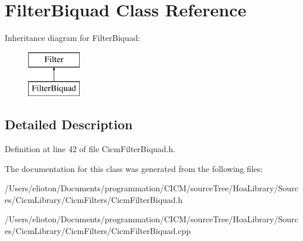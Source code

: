\hypertarget{class_filter_biquad}{\section{Filter\-Biquad Class Reference}
\label{class_filter_biquad}
}
Inheritance diagram for Filter\-Biquad\-:\begin{figure}[H]
\begin{center}
\leavevmode
\includegraphics[height=2.000000cm]{class_filter_biquad}
\end{center}
\end{figure}


\subsection{Detailed Description}


Definition at line 42 of file Cicm\-Filter\-Biquad.\-h.



The documentation for this class was generated from the following files\-:\begin{DoxyCompactItemize}
\item 
/\-Users/elioton/\-Documents/programmation/\-C\-I\-C\-M/source\-Tree/\-Hoa\-Library/\-Sources/\-Cicm\-Library/\-Cicm\-Filters/Cicm\-Filter\-Biquad.\-h\item 
/\-Users/elioton/\-Documents/programmation/\-C\-I\-C\-M/source\-Tree/\-Hoa\-Library/\-Sources/\-Cicm\-Library/\-Cicm\-Filters/Cicm\-Filter\-Biquad.\-cpp\end{DoxyCompactItemize}
